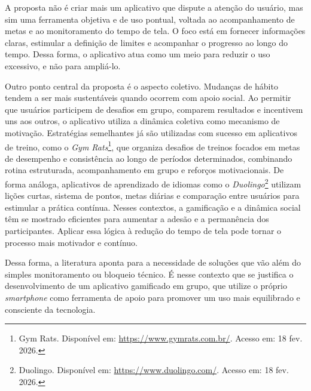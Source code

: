 A proposta não é criar mais um aplicativo que dispute a atenção do usuário, mas sim uma ferramenta objetiva e de uso pontual, voltada ao acompanhamento de metas e ao monitoramento do tempo de tela. O foco está em fornecer informações claras, estimular a definição de limites e acompanhar o progresso ao longo do tempo. Dessa forma, o aplicativo atua como um meio para reduzir o uso excessivo, e não para ampliá-lo.

Outro ponto central da proposta é o aspecto coletivo. Mudanças de hábito tendem a ser mais sustentáveis quando ocorrem com apoio social. Ao permitir que usuários participem de desafios em grupo, comparem resultados e incentivem uns aos outros, o aplicativo utiliza a dinâmica coletiva como mecanismo de motivação. Estratégias semelhantes já são utilizadas com sucesso em aplicativos de treino, como o \textit{Gym Rats}\footnote{Gym Rats. Disponível em: \url{https://www.gymrats.com.br/}. Acesso em: 18 fev. 2026.}, que organiza desafios de treinos focados em metas de desempenho e consistência ao longo de períodos determinados, combinando rotina estruturada, acompanhamento em grupo e reforços motivacionais. De forma análoga, aplicativos de aprendizado de idiomas como o \textit{Duolingo}\footnote{Duolingo. Disponível em: \url{https://www.duolingo.com/}. Acesso em: 18 fev. 2026.} utilizam lições curtas, sistema de pontos, metas diárias e comparação entre usuários para estimular a prática contínua. Nesses contextos, a gamificação e a dinâmica social têm se mostrado eficientes para aumentar a adesão e a permanência dos participantes. Aplicar essa lógica à redução do tempo de tela pode tornar o processo mais motivador e contínuo.

Dessa forma, a literatura aponta para a necessidade de soluções que vão além do simples monitoramento ou bloqueio técnico. É nesse contexto que se justifica o desenvolvimento de um aplicativo gamificado em grupo, que utilize o próprio \textit{smartphone} como ferramenta de apoio para promover um uso mais equilibrado e consciente da tecnologia.